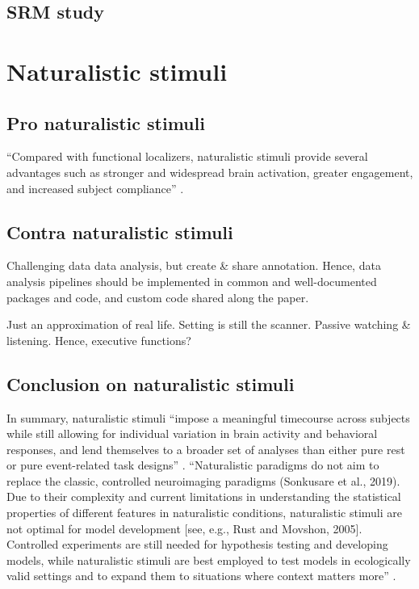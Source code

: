 \subsection{SRM study}



\section{Naturalistic stimuli}

\subsection{Pro naturalistic stimuli}



%
``Compared with functional localizers, naturalistic stimuli provide several
advantages such as stronger and widespread brain activation, greater engagement,
and increased subject compliance'' \citep{jiahui2020predicting}.


\subsection{Contra naturalistic stimuli}

%
Challenging data data analysis, but create \& share annotation.
%
Hence, data analysis pipelines should be implemented in common and
well-documented packages and code, and custom code shared along the paper.

%
Just an approximation of real life.
%
Setting is still the scanner.
%
Passive watching \& listening. Hence, executive functions?


\subsection{Conclusion on naturalistic stimuli}
%
In summary, naturalistic stimuli ``impose a meaningful timecourse across
subjects while still allowing for individual variation in brain activity and
behavioral responses, and lend themselves to a broader set of analyses than
either pure rest or pure event-related task designs'' \citep{finn2017can}.
%
``Naturalistic paradigms do not aim to replace the classic, controlled
neuroimaging paradigms (Sonkusare et al., 2019). Due to their complexity and
current limitations in understanding the statistical properties of different
features in naturalistic conditions, naturalistic stimuli are not optimal for
model development [see, e.g., Rust and Movshon, 2005]. Controlled experiments
are still needed for hypothesis testing and developing models, while
naturalistic stimuli are best employed to test models in ecologically valid
settings and to expand them to situations where context matters
more'' \citep{saarimaki2021naturalistic}.


